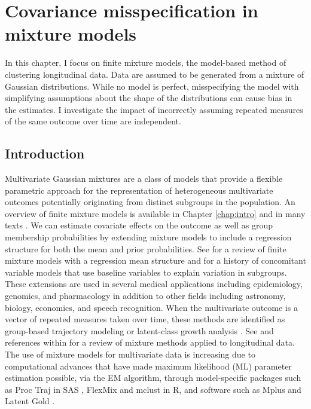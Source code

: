 \chapter{Covariance misspecification in mixture models}
\label{chap:misspecify}
In this chapter, I focus on finite mixture models, the model-based method of clustering longitudinal data. Data are assumed to be generated from a mixture of Gaussian distributions. While no model is perfect, misspecifying the model with simplifying assumptions about the shape of the distributions can cause bias in the estimates. I investigate the impact of incorrectly assuming repeated measures of the same outcome over time are independent. 
\section{Introduction}
Multivariate Gaussian mixtures are a class of models that provide a flexible parametric approach for the representation of heterogeneous multivariate outcomes potentially originating from distinct subgroups in the population. An overview of finite mixture models is available in Chapter \ref{chap:intro} and in many texts \cite{everitt1981,titterington1985,mclachlan1988,mclachlan2000,fruhwirth2006}. We can estimate covariate effects on the outcome as well as group membership probabilities by extending mixture models to include a regression structure for both the mean and prior probabilities. See \textcite{cruzmesia2008} for a review of finite mixture models with a regression mean structure and \textcite{wedel2002} for a history of concomitant variable models that use baseline variables to explain variation in subgroups. These extensions are used in several medical applications  \cite{schlattmann2009} including epidemiology, genomics, and pharmacology in addition to other fields including astronomy, biology, economics, and speech recognition. When the multivariate outcome is a vector of repeated measures taken over time, these methods are identified as group-based trajectory modeling \cite{nagin1999,nagin2005} or latent-class growth analysis \cite{muthen2000, muthen2001}. See \textcite{pickles2010} and references within for a review of mixture methods applied to longitudinal data. The use of mixture models for multivariate data is increasing due to computational advances that have made maximum likelihood (ML) parameter estimation possible, via the EM algorithm, through model-specific packages such as Proc Traj in SAS \cite{jones2001}, FlexMix  \cite{leisch2004} and mclust \cite{fraley1999} in R, and software such as Mplus \cite{muthen2010} and Latent Gold \cite{vermunt2005}.

